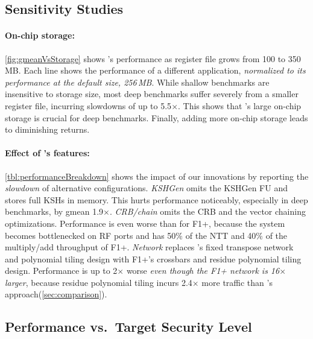 \subsection{Sensitivity Studies}
\label{sec:sensitivity}

\figGmeanVsStorage

\paragraph{On-chip storage:} \autoref{fig:gmeanVsStorage} shows \name's performance
as register file grows from 100 to 350\,MB.
Each line shows the performance of a different application,
\emph{normalized to its performance at the default size, 256\,MB}.
While shallow benchmarks are insensitive to storage size, most deep benchmarks
suffer severely from a smaller register file, incurring slowdowns of up to 5.5$\times$.
This shows that \name's large on-chip storage is crucial for deep benchmarks.
Finally, adding more on-chip storage leads to diminishing returns.


\paragraph{Effect of \name's features:}
\autoref{tbl:performanceBreakdown} shows the impact of our innovations by reporting the \emph{slowdown}
of alternative configurations.
\emph{KSHGen} omits the KSHGen FU and stores full KSHs in memory.
This hurts performance noticeably, especially in deep benchmarks, by gmean 1.9$\times$.
\emph{CRB/chain} omits the CRB and the vector chaining optimizations.
Performance is even worse than for F1+, because the system becomes bottlenecked on RF ports
and \name has
50\% of the NTT and 40\% of the multiply/add throughput of F1+.
\emph{Network} replaces \name's fixed transpose network and polynomial tiling design
with F1+'s crossbars and residue polynomial tiling design.
Performance is up to 2$\times$ worse \emph{even though the F1+ network is 16$\times$ larger},
because residue polynomial tiling incurs 2.4$\times$ more traffic than \name's approach(\autoref{sec:comparison}).

\subsection{Performance vs.\ Target Security Level}
\label{sec:moreSecurity}

